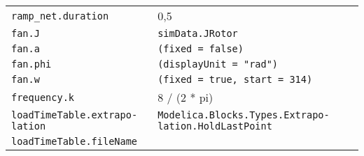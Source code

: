 \begin{longtable}[]{@{}ll@{}}
\begin{minipage}[t]{0.31\columnwidth}
\texttt{ramp\_net.duration}\strut
\end{minipage} & \begin{minipage}[t]{0.63\columnwidth}\raggedright
0,5\strut
\end{minipage}\tabularnewline
\begin{minipage}[t]{0.31\columnwidth}\raggedright
\texttt{fan.J}\strut
\end{minipage} & \begin{minipage}[t]{0.63\columnwidth}\raggedright
\texttt{simData.JRotor}\strut
\end{minipage}\tabularnewline
\begin{minipage}[t]{0.31\columnwidth}\raggedright
\texttt{fan.a}\strut
\end{minipage} & \begin{minipage}[t]{0.63\columnwidth}\raggedright
\texttt{(fixed\ =\ false)}\strut
\end{minipage}\tabularnewline
\begin{minipage}[t]{0.31\columnwidth}\raggedright
\texttt{fan.phi}\strut
\end{minipage} & \begin{minipage}[t]{0.63\columnwidth}\raggedright
\texttt{(displayUnit\ =\ "rad")}\strut
\end{minipage}\tabularnewline
\begin{minipage}[t]{0.31\columnwidth}\raggedright
\texttt{fan.w}\strut
\end{minipage} & \begin{minipage}[t]{0.63\columnwidth}\raggedright
\texttt{(fixed\ =\ true,\ start\ =\ 314)}\strut
\end{minipage}\tabularnewline
\begin{minipage}[t]{0.31\columnwidth}\raggedright
\texttt{frequency.k}\strut
\end{minipage} & \begin{minipage}[t]{0.63\columnwidth}\raggedright
8 / (2 * pi)\strut
\end{minipage}\tabularnewline
\begin{minipage}[t]{0.31\columnwidth}\raggedright
\texttt{loadTimeTable.extra­po­lation}\strut
\end{minipage} & \begin{minipage}[t]{0.63\columnwidth}\raggedright
\texttt{Modelica.­Blocks.­Types.­Extra­po­lation.­HoldLastPoint}\strut
\end{minipage}\tabularnewline
\begin{minipage}[t]{0.31\columnwidth}\raggedright
\texttt{loadTimeTable.fileName}\strut

\end{minipage}
\end{longtable}
